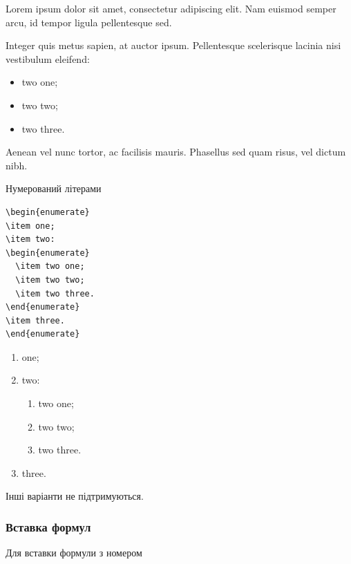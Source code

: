 \begin{longEnumerate}
\item Lorem ipsum dolor sit amet, consectetur adipiscing elit. Nam euismod semper arcu, id tempor ligula pellentesque sed. 
\item Integer quis metus sapien, at auctor ipsum. Pellentesque scelerisque
lacinia nisi vestibulum eleifend:
\begin{itemize}
  \item two one;
  \item two two;
  \item two three.
\end{itemize}
\item Aenean vel nunc tortor, ac facilisis mauris. Phasellus sed quam risus, vel dictum nibh.
\end{longEnumerate}

Нумерований літерами

\begin{lstlisting}
\begin{enumerate}
\item one;
\item two:
\begin{enumerate}
  \item two one;
  \item two two;
  \item two three.
\end{enumerate}
\item three.
\end{enumerate}
\end{lstlisting}

\begin{enumerate}
\item one;
\item two:
\begin{enumerate}
  \item two one;
  \item two two;
  \item two three.
\end{enumerate}
\item three.
\end{enumerate}

Інші варіанти не підтримуються.

\subsubsection{Вставка формул}

Для вставки формули з номером

